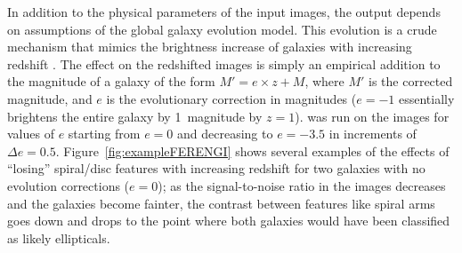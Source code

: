 \documentclass[twocolumn]{aastex6}
\begin{document}

In addition to the physical parameters of the input images, the \ferengi{}
output depends on assumptions of the global galaxy evolution model. This
evolution is a crude mechanism that mimics the brightness increase of galaxies
with increasing redshift \citep[\eg,][]{lil98,lov12}. The effect on the
redshifted images is simply an empirical addition to the magnitude of a galaxy
of the form $M' = e\times z + M$, where $M'$ is the corrected magnitude, and
$e$ is the evolutionary correction in magnitudes ($e=-1$ essentially
brightens the entire galaxy by 1~magnitude by $z=1$). \ferengi{} was run on the images
for values of $e$ starting from $e=0$ and decreasing to $e=-3.5$ in increments
of $\Delta e = 0.5$. Figure~\ref{fig:exampleFERENGI} shows several examples
of the effects of ``losing'' spiral/disc features with increasing redshift
for two galaxies with no evolution corrections ($e=0$); as the signal-to-noise ratio in the images
decreases and the galaxies become fainter, the contrast between features
like spiral arms goes down and \ffeatures{} drops to the point where both
galaxies would have been classified as likely ellipticals. 
\end{document}

